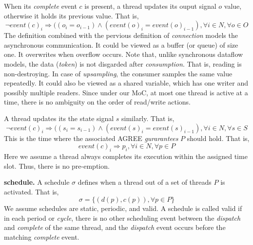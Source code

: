 When its \emph{complete} event $c$ is present, a thread updates its ouput signal $o$ value, otherwise it holds its previous value. That is, 
$$\lnot event(c)_i \Rightarrow ((o_i = o_{i-1}) \land (event(o)_i = event(o)_{i-1}), \forall i \in N, \forall o \in O$$
The definition combined with the pervious definition of \emph{connection} models the asynchronous communication. It could be viewed as a buffer (or queue) of size one. It overwrites when overflow occurs. Note that, unlike synchronous dataflow models, the data (\emph{token}) is not disgarded after \emph{consumption}. That is, reading is non-destroying. In case of \emph{upsampling}, the consumer samples the same value repeatedly. It could also be viewed as a shared variable, which has one writer and possibly multiple readers. Since under our MoC, at most one thread is active at a time, there is no ambiguity on the order of read/write actions.

A thread updates its the state signal $s$ similarly. That is,
$$\lnot event(c)_i \Rightarrow ((s_i = s_{i-1}) \land (event(s)_i = event(s)_{i-1}), \forall i \in N, \forall s \in S$$
This is the time where the associated AGREE \emph{gurarantees} $P$ should hold. That is,
$$event(c)_i \Rightarrow p_i, \forall i\in N, \forall p \in P $$
Here we assume a thread always completes its execution within the assigned time slot. Thus, there is no pre-emption. 


{\bf schedule.}
A schedule $\sigma$ defines when a thread out of a set of threads $P$ is activated. That is,  
$$\sigma = \{(d(p), c(p)), \forall p \in P  \}$$ 
We assume schedules are static, periodic, and valid. A schedule is called valid if in each period or \emph{cycle}, there is no other scheduling event between the \emph{dispatch} and \emph{complete} of the same thread, and the \emph{dispatch} event occurs before the matching \emph{complete} event. 

